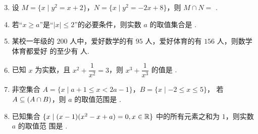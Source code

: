 \documentclass[a4paper,11pt]{article}
\begin{document}


\begin{enumerate}
\setcounter{enumi}{2}

\item 设 $M=\{x\mid y^2=x+2\}$，$N=\{x\mid y^2=-2x+8\}$，则 $M\cap N=$ \blankline[4.4em].

\ifanswer
\solbegin
{}
\solend

\fi

\item 若“$x\geqslant a$”是“$|x|\leqslant2$”的必要条件，则实数 $a$ 的取值集合是 \blankline[4.4em].

\ans{$(-\infty,-2]$}

\item 某校一年级的 $200$ 人中，爱好数学的有 $95$ 人，爱好体育的有 $156$ 人，则数学体育都爱好
的至少有 \blankline[4.4em] 人.

\ifanswer
\solbegin
{}
\solend

\fi

\item 已知 $x$ 为实数，且 $x^2+\dfrac{1}{x^2}=3$，则 $x^3+\dfrac{1}{x^3}$ 的值是 \blankline[4.4em].

\ifanswer
\solbegin
{}
\solend

\fi

\item 非空集合 $A=\{x\mid a+1\leqslant x<2a-1\}$，$B=\{x\mid-2\leqslant x\leqslant5\}$，
若 $A\subseteq(A\cap B)$，则 $a$ 的取值范围是 \blankline[4.4em].

\ifanswer
\solbegin
{}
\solend

\fi

\item 已知集合 $\{x\mid(x-1)(x^2-x+a)=0,x\in\mathbb{R}\}$ 中的所有元素之和为 $1$，则实数 $a$ 的取值范
围是 \blankline[4.4em].


\end{enumerate}
\end{document}
